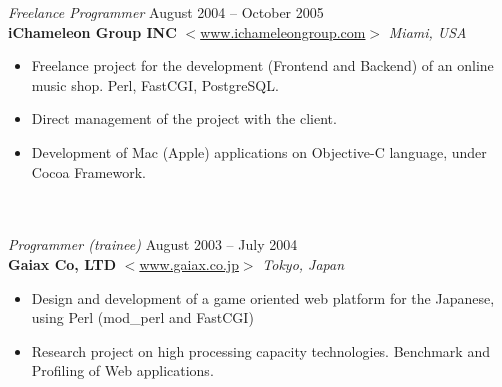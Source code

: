 \documentclass[line,margin]{res}
\begin{document}
\begin{resume}
                {\sl Freelance Programmer} \hfill August 2004 -- October 
                2005 \\
                \textbf{iChameleon Group INC} 
                $<$\url{www.ichameleongroup.com}$>$ \hfill \textit{Miami, USA}
                \begin{itemize}  \itemsep 2pt %
                \item Freelance project for the development (Frontend
                and Backend) of an online music shop. Perl, FastCGI, PostgreSQL.
                \item Direct management of the project with the client.
                \item Development of Mac (Apple) applications on Objective-C
                language, under Cocoa Framework.
                \\
                \end{itemize}
                
                \\
                \\

                {\sl Programmer (trainee)} \hfill August 2003 -- July 
                2004 \\
                \textbf{Gaiax Co, LTD} 
                $<$\url{www.gaiax.co.jp}$>$ \hfill \textit{Tokyo, 
                Japan}
                \begin{itemize}  \itemsep 2pt %
                \item Design and development of a game oriented web platform
                for the Japanese, using Perl (mod\_perl and FastCGI)
                \item Research project on high processing capacity 
                technologies. Benchmark and Profiling of Web applications.
                \\
                \end{itemize} 



\end{resume}
\end{document}
